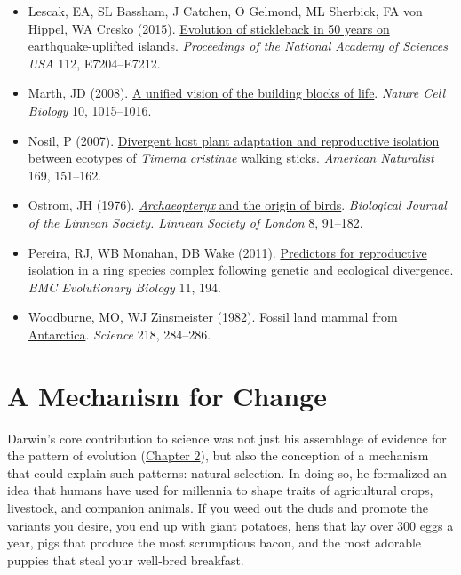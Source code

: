 \documentclass[
]{book}
\begin{document}
\begin{itemize}
\item
  Lescak, EA, SL Bassham, J Catchen, O Gelmond, ML Sherbick, FA von Hippel, WA Cresko (2015). \href{https://www.pnas.org/content/112/52/E7204}{Evolution of stickleback in 50 years on earthquake-uplifted islands}. \emph{Proceedings of the National Academy of Sciences USA} 112, E7204--E7212.
\item
  Marth, JD (2008). \href{https://www.nature.com/articles/ncb0908-1015}{A unified vision of the building blocks of life}. \emph{Nature Cell Biology} 10, 1015--1016.
\item
  Nosil, P (2007). \href{https://www.journals.uchicago.edu/doi/abs/10.1086/510634}{Divergent host plant adaptation and reproductive isolation between ecotypes of \emph{Timema} \emph{cristinae} walking sticks}. \emph{American Naturalist} 169, 151--162.
\item
  Ostrom, JH (1976). \href{https://onlinelibrary.wiley.com/doi/abstract/10.1111/j.1095-8312.1976.tb00244.x}{\emph{Archaeopteryx} and the origin of birds}. \emph{Biological Journal of the Linnean Society. Linnean Society of London} 8, 91--182.
\item
  Pereira, RJ, WB Monahan, DB Wake (2011). \href{https://bmcecolevol.biomedcentral.com/articles/10.1186/1471-2148-11-194}{Predictors for reproductive isolation in a ring species complex following genetic and ecological divergence}. \emph{BMC Evolutionary Biology} 11, 194.
\item
  Woodburne, MO, WJ Zinsmeister (1982). \href{https://science.sciencemag.org/content/218/4569/284}{Fossil land mammal from Antarctica}. \emph{Science} 218, 284--286.
\end{itemize}

\hypertarget{a-mechanism-for-change}{%
\chapter{A Mechanism for Change}\label{a-mechanism-for-change}}

Darwin's core contribution to science was not just his assemblage of evidence for the pattern of evolution (\href{evidence-for-evolution.html}{Chapter 2}), but also the conception of a mechanism that could explain such patterns: natural selection. In doing so, he formalized an idea that humans have used for millennia to shape traits of agricultural crops, livestock, and companion animals. If you weed out the duds and promote the variants you desire, you end up with giant potatoes, hens that lay over 300 eggs a year, pigs that produce the most scrumptious bacon, and the most adorable puppies that steal your well-bred breakfast.
\end{document}
